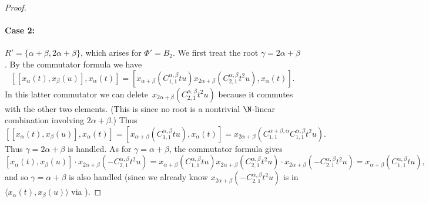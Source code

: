 \documentclass[11pt]{article}
\begin{document}
\begin{proof}
    \paragraph{Case 2:} $R' = \{ \alpha+\beta, 2\alpha + \beta\}$, which arises for $\Phi' = B_2$.  We first treat the root $\gamma = 2\alpha+\beta$.  By the commutator formula we have
    \[
        [[x_\alpha(t),x_\beta(u)],x_\alpha(t)] = [x_{\alpha+\beta}(C_{1,1}^{\alpha,\beta}tu) x_{2\alpha+\beta}(C_{2,1}^{\alpha,\beta}t^2u), x_\alpha(t)].
    \]
    In  this latter  commutator we can delete~$x_{2\alpha+\beta}(C_{2,1}^{\alpha,\beta}t^2u)$ because it commutes with the other two elements. (This is since no root is a nontrivial $\N$-linear combination involving $2\alpha+\beta$.)  Thus
    \begin{equation}    \label{C2a}
        [[x_\alpha(t),x_\beta(u)],x_\alpha(t)] = 
        [x_{\alpha+\beta}(C_{1,1}^{\alpha,\beta}tu), x_\alpha(t)] = 
        x_{2\alpha+\beta}(C_{1,1}^{\alpha+\beta,\alpha}C_{1,1}^{\alpha,\beta}t^2u).
    \end{equation}
    Thus $\gamma = 2\alpha+\beta$ is handled.  As for $\gamma = \alpha + \beta$, the commutator formula gives 
    \[
        [x_\alpha(t),x_\beta(u)]\cdot x_{2\alpha+\beta}(-C_{2,1}^{\alpha,\beta}t^2u) =  x_{\alpha+\beta}(C_{1,1}^{\alpha,\beta}tu)x_{2\alpha+\beta}(C_{2,1}^{\alpha,\beta}t^2u)\cdot x_{2\alpha+\beta}(-C_{2,1}^{\alpha,\beta}t^2u)
        = x_{\alpha+\beta}(C_{1,1}^{\alpha,\beta}tu),
    \]
    and so $\gamma = \alpha+\beta$ is also handled (since we already know $x_{2\alpha+\beta}(-C_{2,1}^{\alpha,\beta}t^2u)$ is in $\langle x_\alpha(t), x_\beta(u) \rangle$ via ).


\end{proof}
\end{document}
